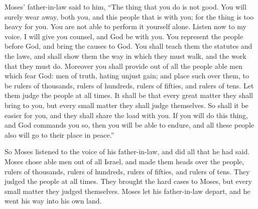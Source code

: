 {Moses’ father-in-law said to him, “The thing that you do is not good.
You will surely wear away, both you, and this people that is with you; for the thing is too heavy for you. You are not able to perform it yourself alone.
Listen now to my voice. I will give you counsel, and God be with you. You represent the people before God, and bring the causes to God.
You shall teach them the statutes and the laws, and shall show them the way in which they must walk, and the work that they must do.
Moreover you shall provide out of all the people able men which fear God: men of truth, hating unjust gain; and place such over them, to be rulers of thousands, rulers of hundreds, rulers of fifties, and rulers of tens.
Let them judge the people at all times. It shall be that every great matter they shall bring to you, but every small matter they shall judge themselves. So shall it be easier for you, and they shall share the load with you.
If you will do this thing, and God commands you so, then you will be able to endure, and all these people also will go to their place in peace.”
\par }{\PP {}So Moses listened to the voice of his father-in-law, and did all that he had said.
Moses chose able men out of all Israel, and made them heads over the people, rulers of thousands, rulers of hundreds, rulers of fifties, and rulers of tens.
They judged the people at all times. They brought the hard cases to Moses, but every small matter they judged themselves.
Moses let his father-in-law depart, and he went his way into his own land.

}
